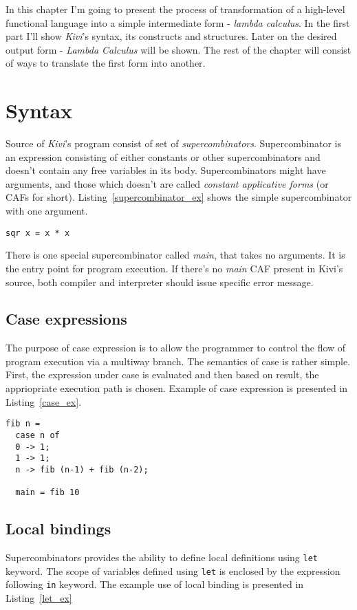 \documentclass[a4paper]{report}
\begin{document}
In this chapter I'm going to present the process of transformation of a
high-level functional language into a simple intermediate form - \textit{lambda
calculus}. In the first part I'll show \textit{Kivi}'s syntax, its
constructs and structures. Later on the desired output form -
\textit{Lambda Calculus} will be shown. The rest of the chapter will
consist of ways to translate the first form into another.

\section{Syntax}
Source of \textit{Kivi}'s program consist of set of
\textit{supercombinators}\cite{wiki:supercombinator}. Supercombinator is an
expression consisting of either constants or other supercombinators and
doesn't contain any free variables in its body. Supercombinators might have
arguments, and those which doesn't are called \textit{constant applicative forms}
(or CAFs for short). Listing~\ref{supercombinator_ex} shows the simple
supercombinator with one argument.

\begin{lstlisting}[label=supercombinator_ex,caption={Simple supercombinator.}]
  sqr x = x * x
\end{lstlisting}

There is one special supercombinator called \textit{main}, that takes no
arguments. It is the entry point for program execution. If there's no
\textit{main} CAF present in Kivi's source, both compiler and interpreter
should issue specific error message.

\subsection{Case expressions}
The purpose of case expression is to allow the programmer to control the flow
of program execution via a multiway branch. The semantics of case is rather
simple. First, the expression under case is evaluated and then based on result,
the appriopriate execution path is chosen. Example of case expression is
presented in Listing~\ref{case_ex}.

\begin{lstlisting}[label=case_ex,caption={Fibonacci with case}]
  fib n =
  case n of
  0 -> 1;
  1 -> 1;
  n -> fib (n-1) + fib (n-2);

  main = fib 10
\end{lstlisting}

\subsection{Local bindings}
Supercombinators provides the ability to define local definitions using
\texttt{let} keyword. The scope of variables defined using \texttt{let} is
enclosed by the expression following \texttt{in} keyword. The example use of
local binding is presented in Listing~\ref{let_ex}
\end{document}
